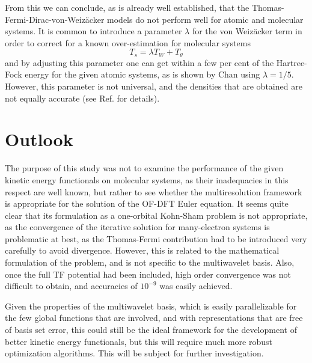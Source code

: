 From this we can conclude, as is already well established, that the 
Thomas-Fermi-Dirac-von-Weiz\"{a}cker models do not perform well for atomic and molecular 
systems. It is common to introduce a parameter $\lambda$ for the von Weiz\"{a}cker term 
in order to correct for a known over-estimation for molecular systems
\begin{equation}
    T_s = \lambda T_W + T_\theta
\end{equation}
and by adjusting this parameter one can get within a few per cent of the Hartree-Fock energy 
for the given atomic systems, as is shown by Chan \etal\cite{Chan:2000} using $\lambda=1/5$. 
However, this parameter is not universal, and the densities that are obtained are not equally 
accurate (see Ref.\cite{Chan:2000} for details).

\section{Outlook}
The purpose of this study was not to examine the performance of the given kinetic energy 
functionals on molecular systems, as their inadequacies in this respect are well known, 
but rather to see whether the multiresolution framework is appropriate for the solution 
of the OF-DFT Euler equation. It seems quite clear that its formulation as a one-orbital 
Kohn-Sham problem is not appropriate, as the convergence of the iterative solution for 
many-electron systems is problematic at best, as the Thomas-Fermi contribution had to be 
introduced very carefully to avoid divergence. However, this is related to the
mathematical formulation of the problem, and is not specific to the multiwavelet basis.
Also, once the full TF potential had 
been included, high order convergence was not difficult to obtain, and accuracies of 
$10^{-9}$ was easily achieved.

Given the properties of the multiwavelet basis, which is easily parallelizable for the few 
global functions that are involved, and with representations that are free of basis set error, 
this could still be the ideal framework for the development of better kinetic energy functionals, 
but this will require much more robust optimization algorithms. This will be subject for 
further investigation.
